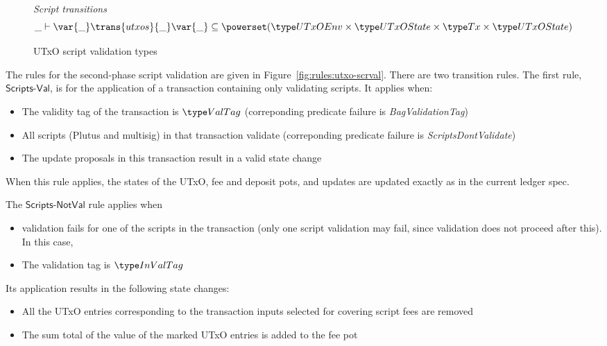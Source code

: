 \begin{figure}[htb]
  \emph{Script transitions}
  \begin{equation*}
    \_ \vdash
    \var{\_} \trans{utxos}{\_} \var{\_}
    \subseteq \powerset (\UTxOEnv \times \UTxOState \times \Tx \times \UTxOState)
  \end{equation*}
  \caption{UTxO script validation types}
  \label{fig:ts-types:utxo-scripts}
\end{figure}

The rules for the second-phase script validation are given in
Figure~\ref{fig:rules:utxo-scrval}. There are two transition rules.
The first rule, $\mathsf{Scripts\mbox{-}Val}$,
is for the application of a transaction containing only
validating scripts. It applies when:

\begin{itemize}
  \item The validity tag of the transaction is $\ValTag$
  (correponding predicate failure is \emph{BagValidationTag})
  \item All scripts (Plutus and multisig) in that transaction validate
  (correponding predicate failure is \emph{ScriptsDontValidate})
  \item The update proposals in this transaction result in a valid state change
\end{itemize}

When this rule applies, the states of the UTxO, fee
  and deposit pots, and updates are updated exactly as in the current
  ledger spec.

The $\mathsf{Scripts\mbox{-}NotVal}$ rule applies when

\begin{itemize}
  \item validation fails
  for one of the scripts in the transaction (only one script validation may fail,
  since validation does not proceed after this). In this case,
  \item The validation tag is $\InValTag$
\end{itemize}

Its application results in the following state changes:

\begin{itemize}
  \item All the
  UTxO entries corresponding to the transaction inputs selected for covering
  script fees are removed

  \item The sum total of the value of the marked UTxO entries
  is added to the fee pot
\end{itemize}

